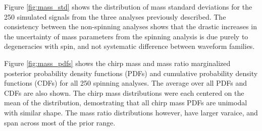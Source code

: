Figure \ref{fig:mass_std} shows the distribution of mass standard deviations for the 250 simulated signals from the three analyses previously described.  The consistency between the non-spinning analyses shows that the drastic increases in the uncertainty of mass parameters from the spinning analysis is due purely to degeneracies with spin, and not systematic difference between waveform families.

Figure \ref{fig:mass_pdfs} shows the chirp mass and mass ratio marginalized posterior probability density functions (PDFs) and cumulative probability density functions (CDFs) for all 250 spinning analyses.  The average over all PDFs and CDFs are also shown.  The chirp mass distributions were each centered on the mean of the distribution, demostrating that all chirp mass PDFs are unimodal with similar shape.  The mass ratio distributions however, have larger varaice, and span across most of the prior range.